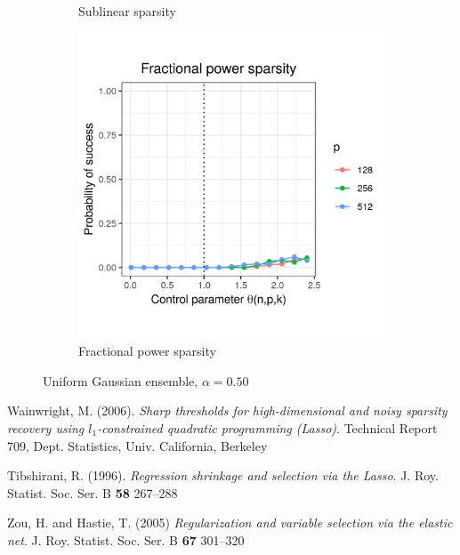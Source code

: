 \documentclass[letterpaper,12pt]{article}
\begin{document}
\begin{figure}[h]
\begin{subfigure}{0.32\textwidth}
    \caption{Sublinear sparsity}
    \label{fig:uniform_sublinear_sparsity_alpha_1}
  \end{subfigure}
  \begin{subfigure}{0.32\textwidth}
    \includegraphics[width=0.9\linewidth]{uniform_fractional_power_sparsity_alpha_050}
    \caption{Fractional power sparsity}
    \label{fig:uniform_fractional_power_sparsity_alpha_1}
  \end{subfigure}
  \caption{Uniform Gaussian ensemble, $\alpha = 0.50$}
  \label{fig:uniform_alpha_050}
\end{figure}

\begin{thebibliography}{9}
  Wainwright, M. (2006).
  \textit{Sharp thresholds for high-dimensional and noisy sparsity
    recovery using $l_1$-constrained quadratic programming (Lasso)}.
  Technical Report 709, Dept. Statistics, Univ. California,
  Berkeley

  Tibshirani, R. (1996).
  \textit{Regression shrinkage and selection via the Lasso}.
  J. Roy. Statist. Soc. Ser. B \textbf{58} 267--288

  Zou, H. and Hastie, T. (2005)
  \textit{Regularization and variable selection via the elastic net}.
  J. Roy. Statist. Soc. Ser. B \textbf{67} 301--320

\end{thebibliography}
\end{document}
